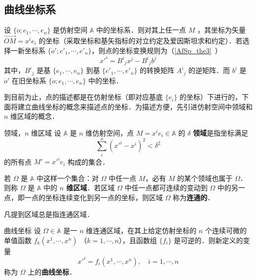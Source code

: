 
\begin{issues}
\issueDraft
\end{issues}

\subsection{曲线坐标系}
设 $\{\dot o;e_1,\cdots,e_n\}$ 是仿射空间 $\mathbb A$ 中的坐标系．则对其上任一点 $M$ ，其坐标为矢量 $\overrightarrow{OM}=x^i e_i$ 的坐标（采取坐标和基矢指标的对立约定及爱因斯坦求和约定）．若选择一新坐标系 $\{\dot o';e'_1,\cdots,e'_n\}$，则点的坐标变换规则为（\autoref{AfSp_the3}~）
\begin{equation}
x'^i={B^i}_jx^j-{B^i}_j b^j
\end{equation}
其中，${B^i}_j$ 是基 $\{e_1,\cdots,e_n\}$ 到基 $\{e'_1,\cdots,e'_n\}$ 的转换矩阵 ${A^i}_j$ 的逆矩阵．而 $b^i$ 是 $\dot o'$ 在旧坐标系 $\{\dot o;e_1,\cdots,e_n\}$ 中的坐标．

到目前为止，点的描述都是在仿射坐标（即对应基底 $\{e_i\}$ 的坐标）下进行的，下面将建立曲线坐标的概念来描述点的坐标．为描述方便，先引进仿射空间中领域和 $n$ 维区域的概念．
\begin{definition}{领域，$n$ 维区域}
设 $\mathbb A$ 是 $n$ 维仿射空间，点 $M=x^ie_i\in\mathbb A$ 的 $\delta$ \textbf{领域}是指坐标满足
\begin{equation}
\sum_{i}^n(x'^i-x^i)^2<\delta^2
\end{equation}
的所有点 $M'=x'^i e_i$ 构成的集合．

若 $\Omega$ 是 $\mathbb A$ 中这样一个集合：对 $\Omega$ 中任一点 $M$，必有 $M$ 的某个领域也属于 $\Omega$．则称 $\Omega$ 是 $\mathbb A$ 中的\textbf{ $n$ 维区域}．若区域 $\Omega$ 中任一点都可连续的变动到 $\Omega$ 中的另一点，即一点的坐标连续变化到另一点的坐标，则区域 $\Omega$ 称为\textbf{连通的}．
\end{definition}

凡提到区域总是指连通区域．

\begin{definition}{曲线坐标}
设 $\Omega\in\mathbb A$ 是一 $n$ 维连通区域，在其上给定仿射坐标的 $n$ 个连续可微的单值函数 $f_k(x^1,\cdots,x^n)$ （$k=1,\cdots,n$），且函数组 $\{f_i\}$ 是可逆的．则新定义的变量
\begin{equation}
x'^i=f_i(x^1,\cdots,x^n),\quad i=1,\cdots,n
\end{equation}
称为 $\Omega$ 上的\textbf{曲线坐标}．
\end{definition}

